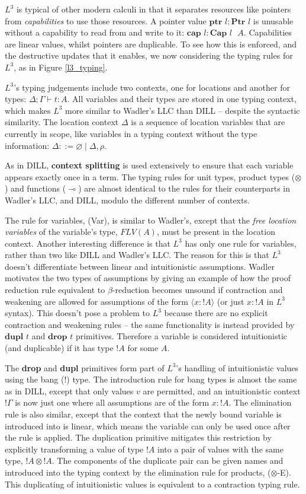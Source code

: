 \documentclass[]{unswthesis}
\let\emptyset\varnothing
\newcommand{\lolly}{\multimap}
\newcommand{\types}{\vdash}
\newcommand{\sor}{\; | \;}
\newcommand{\Ptr}[1]{\textbf{Ptr $#1$}}
\newcommand{\ptr}[1]{\textbf{ptr $#1$}}
\newcommand{\Capa}[2]{\textbf{Cap $#1$ $#2$}}
\newcommand{\capa}[1]{\textbf{cap $#1$}}
\newcommand{\dupl}[1]{\textbf{dupl $#1$}}
\newcommand{\drop}[1]{\textbf{drop $#1$}}
\let\i\textit
\let\b\textbf
\begin{document}
$L^3$ is typical of other modern calculi in that it separates resources like pointers from \i{capabilities} to use those resources. A pointer value $\ptr{l} : \Ptr{l}$ is unusable without a capability to read from and write to it: $\capa{l} : \Capa{l}{A}$. Capabilities are linear values, whilst pointers are duplicable. To see how this is enforced, and the destructive updates that it enables, we now considering the typing rules for $L^3$, as in Figure \ref{l3_typing}.

$L^3$'s typing judgements include two contexts, one for locations and another for types: $\Delta; \Gamma \types t : A$. All variables and their types are stored in one typing context, which makes $L^3$ more similar to Wadler's LLC than DILL -- despite the syntactic similarity. The location context $\Delta$ is a sequence of location variables that are currently in scope, like variables in a typing context without the type information: $\Delta ::= \emptyset \sor \Delta, \rho$.

As in DILL, \b{context splitting} is used extensively to ensure that each variable appears exactly once in a term. The typing rules for unit types, product types ($\otimes$) and functions ($\lolly$) are almost identical to the rules for their counterparts in Wadler's LLC, and DILL, modulo the different number of contexts.

The rule for variables, (Var), is similar to Wadler's, except that the \i{free location variables} of the variable's type, $FLV(A)$, must be present in the location context. Another interesting difference is that $L^3$ has only one rule for variables, rather than two like DILL and Wadler's LLC. The reason for this is that $L^3$ doesn't differentiate between linear and intuitionistic assumptions. Wadler motivates the two types of assumptions by giving an example of how the proof reduction rule equivalent to $\beta$-reduction becomes unsound if contraction and weakening are allowed for assumptions of the form $\langle x : {!A} \rangle$ (or just $x : {!A}$ in $L^3$ syntax). This doesn't pose a problem to $L^3$ because there are no explicit contraction and weakening rules -- the same functionality is instead provided by $\dupl{t}$ and $\drop{t}$ primitives. Therefore a variable is considered intuitionistic (and duplicable) if it has type ${!A}$ for some $A$.

The \b{drop} and \b{dupl} primitives form part of $L^3$'s handling of intuitionistic values using the bang (!) type. The introduction rule for bang types is almost the same as in DILL, except that only values $v$ are permitted, and an intuitionistic context $!\Gamma$ is now just one where all assumptions are of the form $x : {!A}$. The elimination rule is also similar, except that the context that the newly bound variable is introduced into is linear, which means the variable can only be used once after the rule is applied. The duplication primitive mitigates this restriction by explicitly transforming a value of type $!A$ into a pair of values with the same type, ${!A} \otimes {!A}$. The components of the duplicate pair can be given names and introduced into the typing context by the elimination rule for products, ($\otimes$-E). This duplicating of intuitionistic values is equivalent to a contraction typing rule.
\end{document}
